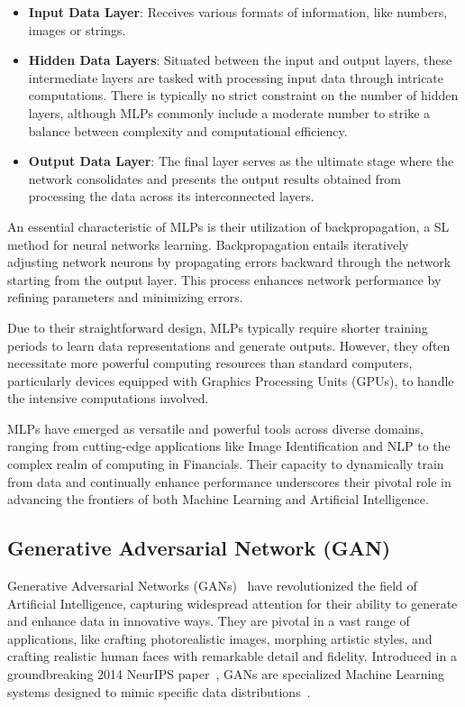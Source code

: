 \documentclass[12pt,a4paper]{report}
\begin{document}
\begin{itemize}
  \item \textbf{Input Data Layer}: Receives various formats of information, like numbers, images or strings.
  \item \textbf{Hidden Data Layers}:
        Situated between the input and output layers, these intermediate layers are tasked with processing input data through intricate computations. There is typically no strict constraint on the number of hidden layers, although MLPs commonly include a moderate number to strike a balance between complexity and computational efficiency.
  \item \textbf{Output Data Layer}: The final layer serves as the ultimate stage where the network consolidates and presents the output results obtained from processing the data across its interconnected layers.
\end{itemize}


An essential characteristic of MLPs is their utilization of backpropagation, a SL method for neural networks learning. Backpropagation entails iteratively adjusting network neurons by propagating errors backward through the network starting from the output layer. This process enhances network performance by refining parameters and minimizing errors.

Due to their straightforward design, MLPs typically require shorter training periods to learn data representations and generate outputs. However, they often necessitate more powerful computing resources than standard computers, particularly devices equipped with Graphics Processing Units (GPUs), to handle the intensive computations involved.

MLPs have emerged as versatile and powerful tools across diverse domains, ranging from cutting-edge applications like Image Identification and NLP to the complex realm of computing in Financials. Their capacity to dynamically train from data and continually enhance performance underscores their pivotal role in advancing the frontiers of both Machine Learning and Artificial Intelligence.

\subsection{Generative Adversarial Network (GAN)}
Generative Adversarial Networks (GANs)~\cite{goodfellow2014generative} have revolutionized the field of Artificial Intelligence, capturing widespread attention for their ability to generate and enhance data in innovative ways. They are pivotal in a vast range of applications, like crafting photorealistic images, morphing artistic styles, and crafting realistic human faces with remarkable detail and fidelity. Introduced in a groundbreaking 2014 NeurIPS paper~\cite{goodfellow2014generative}, GANs are specialized Machine Learning systems designed to mimic specific data distributions~\cite{gan}.
\end{document}
